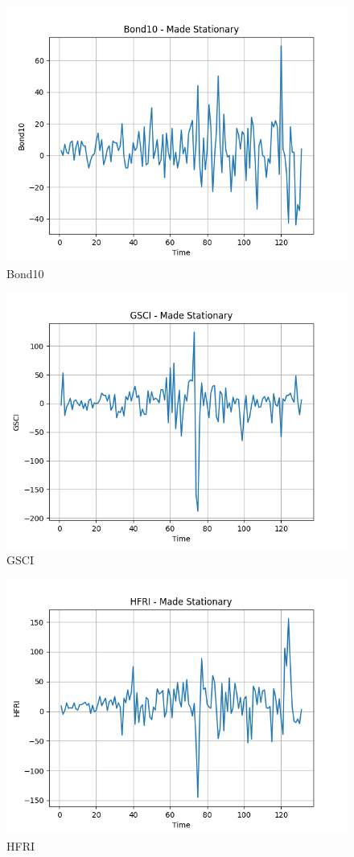 \documentclass[12pt]{article}
\begin{document}
\begin{figure}[H]
    \centering
    \includegraphics[width=0.75\linewidth]{Bond10_stationary.png}
        \caption{Bond10}
    \label{fig:enter-label}
\end{figure}
\begin{figure}[H]
    \centering
    \includegraphics[width=0.75\linewidth]{GSCI_stationary.png}
    \caption{GSCI}
    \label{fig:enter-label}
\end{figure}
\begin{figure}[H]
    \centering
    \includegraphics[width=0.75\linewidth]{HFRI_stationary.png}
    \caption{HFRI}
    \label{fig:enter-label}
\end{figure}
\end{document}
